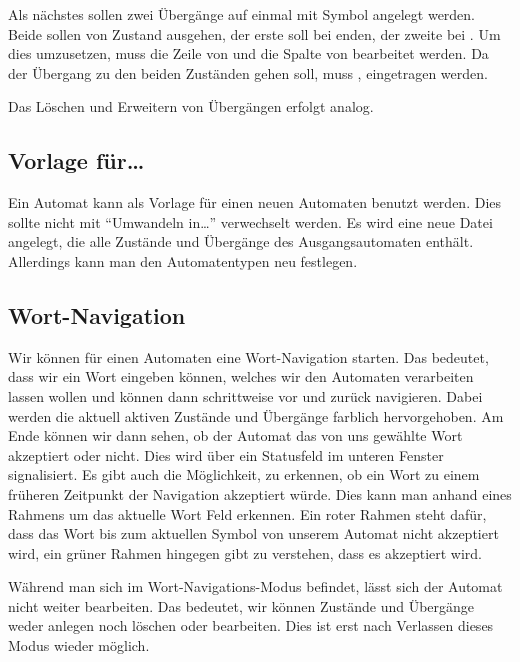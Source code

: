 Als nächstes sollen zwei Übergänge auf einmal mit Symbol  angelegt
werden. Beide sollen von Zustand  ausgehen, der erste soll bei
 enden, der zweite bei . Um dies umzusetzen, muss die Zeile
von  und die Spalte von  bearbeitet werden. Da der Übergang
zu den beiden Zuständen gehen soll, muss ,  eingetragen
werden.\vspace{10pt}

Das Löschen und Erweitern von Übergängen erfolgt analog.


\subsection{Vorlage für\ldots}
  
  Ein Automat kann als Vorlage für einen neuen Automaten benutzt werden. Dies
  sollte nicht mit "`Umwandeln in\ldots"' verwechselt werden. Es wird eine neue
  Datei angelegt, die alle Zustände und Übergänge des Ausgangsautomaten enthält.
  Allerdings kann man den Automatentypen neu festlegen.
  
\subsection{Wort-Navigation}
  
  Wir können für einen Automaten eine Wort-Navigation starten. Das bedeutet,
  dass wir ein Wort eingeben können, welches wir den Automaten verarbeiten lassen
  wollen und können dann schrittweise vor und zurück navigieren. Dabei werden
  die aktuell aktiven Zustände und Übergänge farblich hervorgehoben. Am Ende
  können wir dann sehen, ob der Automat das von uns gewählte Wort akzeptiert oder
  nicht. Dies wird über ein Statusfeld im unteren Fenster signalisiert. Es gibt
  auch die Möglichkeit, zu erkennen, ob ein Wort zu einem früheren Zeitpunkt der
  Navigation akzeptiert würde. Dies kann man anhand eines Rahmens um das aktuelle
  Wort Feld erkennen. Ein roter Rahmen steht dafür, dass das Wort bis zum
  aktuellen Symbol von unserem Automat nicht akzeptiert wird, ein grüner Rahmen
  hingegen gibt zu verstehen, dass es akzeptiert wird.\vspace{10pt}
  
  \newpage
  Während man sich im Wort-Navigations-Modus befindet, lässt sich der Automat
  nicht weiter bearbeiten. Das bedeutet, wir können Zustände und Übergänge weder
  anlegen noch löschen oder bearbeiten. Dies ist erst nach Verlassen dieses
  Modus wieder möglich.\vspace{10pt}
  
